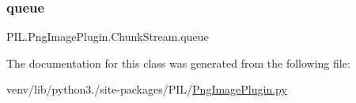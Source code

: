 \subsubsection{\texorpdfstring{queue}{queue}}
{\footnotesize\ttfamily P\+I\+L.\+Png\+Image\+Plugin.\+Chunk\+Stream.\+queue}



The documentation for this class was generated from the following file\+:\begin{DoxyCompactItemize}
\item 
venv/lib/python3./site-\/packages/\+P\+I\+L/\hyperlink{PngImagePlugin_8py}{Png\+Image\+Plugin.\+py}\end{DoxyCompactItemize}
